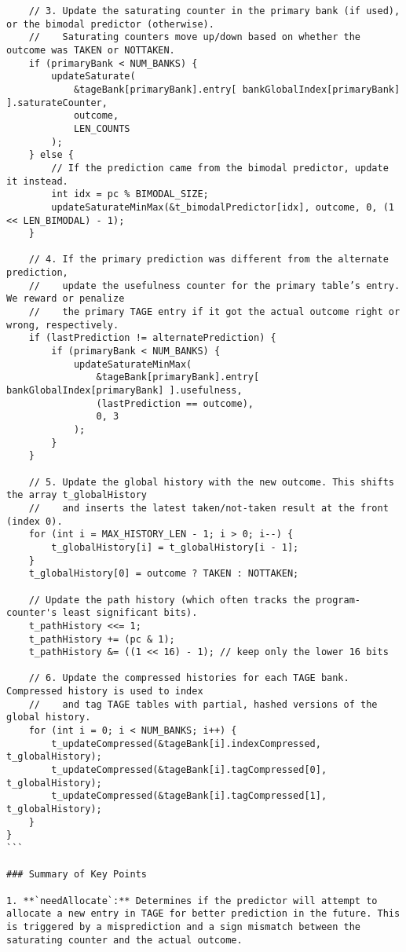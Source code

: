 \documentclass[11pt]{article}
\begin{document}
\begin{verbatim}
    // 3. Update the saturating counter in the primary bank (if used), or the bimodal predictor (otherwise).
    //    Saturating counters move up/down based on whether the outcome was TAKEN or NOTTAKEN.
    if (primaryBank < NUM_BANKS) {
        updateSaturate(
            &tageBank[primaryBank].entry[ bankGlobalIndex[primaryBank] ].saturateCounter,
            outcome,
            LEN_COUNTS
        );
    } else {
        // If the prediction came from the bimodal predictor, update it instead.
        int idx = pc % BIMODAL_SIZE;
        updateSaturateMinMax(&t_bimodalPredictor[idx], outcome, 0, (1 << LEN_BIMODAL) - 1);
    }

    // 4. If the primary prediction was different from the alternate prediction,
    //    update the usefulness counter for the primary table’s entry. We reward or penalize
    //    the primary TAGE entry if it got the actual outcome right or wrong, respectively.
    if (lastPrediction != alternatePrediction) {
        if (primaryBank < NUM_BANKS) {
            updateSaturateMinMax(
                &tageBank[primaryBank].entry[ bankGlobalIndex[primaryBank] ].usefulness,
                (lastPrediction == outcome),
                0, 3
            );
        }
    }

    // 5. Update the global history with the new outcome. This shifts the array t_globalHistory
    //    and inserts the latest taken/not-taken result at the front (index 0).
    for (int i = MAX_HISTORY_LEN - 1; i > 0; i--) {
        t_globalHistory[i] = t_globalHistory[i - 1];
    }
    t_globalHistory[0] = outcome ? TAKEN : NOTTAKEN;

    // Update the path history (which often tracks the program-counter's least significant bits).
    t_pathHistory <<= 1;
    t_pathHistory += (pc & 1);
    t_pathHistory &= ((1 << 16) - 1); // keep only the lower 16 bits

    // 6. Update the compressed histories for each TAGE bank. Compressed history is used to index
    //    and tag TAGE tables with partial, hashed versions of the global history.
    for (int i = 0; i < NUM_BANKS; i++) {
        t_updateCompressed(&tageBank[i].indexCompressed, t_globalHistory);
        t_updateCompressed(&tageBank[i].tagCompressed[0], t_globalHistory);
        t_updateCompressed(&tageBank[i].tagCompressed[1], t_globalHistory);
    }
}
```

### Summary of Key Points

1. **`needAllocate`:** Determines if the predictor will attempt to allocate a new entry in TAGE for better prediction in the future. This is triggered by a misprediction and a sign mismatch between the saturating counter and the actual outcome.


\end{verbatim}
\end{document}
